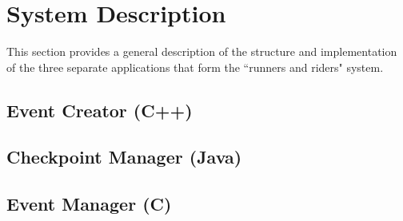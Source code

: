 \documentclass[a4paper, 10pt]{article}
\begin{document}


\clearpage
\section{System Description}

This section provides a general description of the structure and implementation of the three separate applications that form the ``runners and riders" system.

\subsection{Event Creator (C++)}

\subsection{Checkpoint Manager (Java)}

\subsection{Event Manager (C)}
\end{document}
